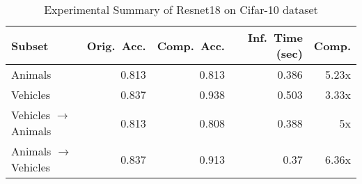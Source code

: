 \documentclass[../main]{subfiles}
\begin{document}
    \begin{table}[t]
        \centering
        \caption{Experimental Summary of Resnet18 on Cifar-10 dataset}
        \begin{tabular}{l r r r r}
            \toprule
            Subset					& Orig.~Acc.	& Comp.~Acc.	& Inf.~Time (sec)	& Comp.	\\
            \midrule
            Animals					& 0.813			& 0.813			& 0.386				& 5.23x	\\
            Vehicles				& 0.837			& 0.938			& 0.503				& 3.33x	\\
            Vehicles $\to$ Animals	& 0.813			& 0.808			& 0.388				& 5x	\\
            Animals $\to$ Vehicles	& 0.837			& 0.913			& 0.37				& 6.36x	\\
            \bottomrule
        \end{tabular}
        \label{tab:ResNet18-CIFAR10_subset+transfer}
    \end{table}
\end{document}
